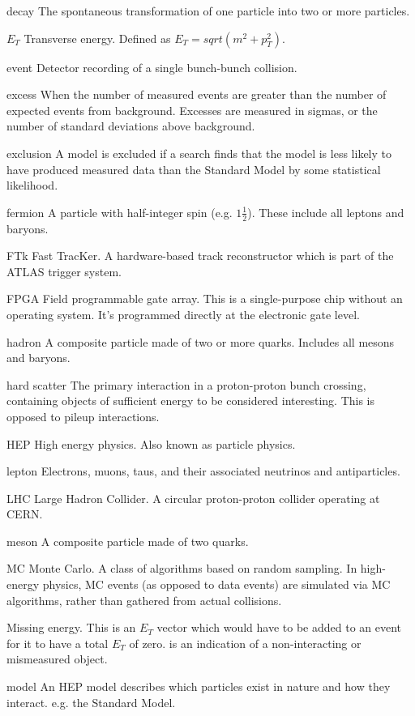 \begin{symbollist*}
\item[decay] The spontaneous transformation of one particle into two or more particles.
\item[$E_T$] Transverse energy. Defined as $E_T = sqrt(m^2 + p_T^2)$.
\item[event] Detector recording of a single bunch-bunch collision.
\item[excess] When the number of measured events are greater than the number of expected events from background. Excesses are measured in sigmas, or the number of standard deviations above background.
\item[exclusion] A model is excluded if a search finds that the model is less likely to have produced measured data than the Standard Model by some statistical likelihood.
\item[fermion] A particle with half-integer spin (e.g. $1\frac{1}{2}$). These include all leptons and baryons.
\item[FTk] Fast TracKer. A hardware-based track reconstructor which is part of the ATLAS trigger system.
\item[FPGA] Field programmable gate array. This is a single-purpose chip without an operating system. It's programmed directly at the electronic gate level.
\item[hadron] A composite particle made of two or more quarks. Includes all mesons and baryons.
\item[hard scatter] The primary interaction in a proton-proton bunch crossing, containing objects of sufficient energy to be considered interesting. This is opposed to pileup interactions.
\item[HEP] High energy physics. Also known as particle physics.
\item[lepton] Electrons, muons, taus, and their associated neutrinos and antiparticles.
\item[LHC] Large Hadron Collider. A circular proton-proton collider operating at CERN.
\item[meson] A composite particle made of two quarks.
\item[MC] Monte Carlo. A class of algorithms based on random sampling. In high-energy physics, MC events (as opposed to data events) are simulated via MC algorithms, rather than gathered from actual collisions.
\item[\MET] Missing energy. This is an $E_T$ vector which would have to be added to an event for it to have a total $E_T$ of zero. \MET is an indication of a non-interacting or mismeasured object.
\item[model] An HEP model describes which particles exist in nature and how they interact. e.g. the Standard Model.

\end{symbollist*}
